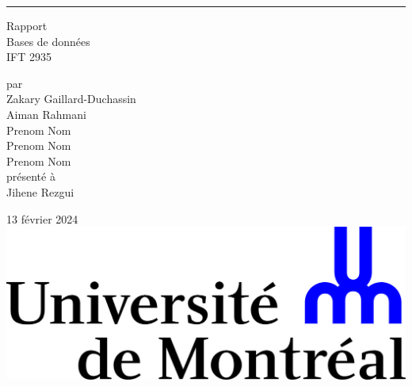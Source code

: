 \documentclass{article}
\begin{document}
\begin{titlepage}
  \centering
  
  \rule{\textwidth}{0px}
  \vspace{15mm}
  
  \Huge{Rapport} \\
  \vspace{5mm}
  \Large Bases de données \\
  IFT 2935
  
  \vspace{40mm}
  \large par \\ \vspace{3mm}
  Zakary Gaillard-Duchassin\\ \vspace{3mm}
  Aiman Rahmani \\ \vspace{3mm}
  Prenom Nom \\ \vspace{3mm}
  Prenom Nom \\ \vspace{3mm}
  Prenom Nom \\ \vspace{3mm}
  \vspace{30mm}
  présenté à \\ \vspace{3mm}
  Jihene Rezgui
  
  \vfill
  13 février 2024 \\ \vspace{3mm}
  \includegraphics[scale=0.55]{logo-udem.png}
\end{titlepage}
\newpage

\end{document}
